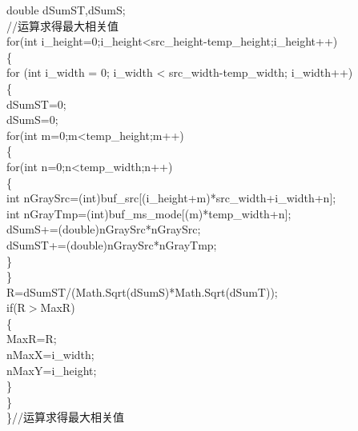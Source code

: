 ﻿\documentclass[12pt,a4paper,oneside]{book}
\begin{document}
\begin{enumerate}
\hspace*{4em}double dSumST,dSumS;\\
\hspace*{4em}//运算求得最大相关值\\
\hspace*{4em}for(int i\_height=0;i\_height<src\_height-temp\_height;i\_height++)\\
\hspace*{4em}\{\\
\hspace*{6em}for (int i\_width = 0; i\_width < src\_width-temp\_width; i\_width++)    \\
\hspace*{6em}\{\\
\hspace*{8em}dSumST=0;\\
\hspace*{8em}dSumS=0;\\
\hspace*{8em}for(int m=0;m<temp\_height;m++)\\
\hspace*{8em}\{\\
\hspace*{10em}for(int n=0;n<temp\_width;n++)\\
\hspace*{10em}\{\\
\hspace*{12em}int nGraySrc=(int)buf\_src[(i\_height+m)*src\_width+i\_width+n];\\
\hspace*{12em}int nGrayTmp=(int)buf\_ms\_mode[(m)*temp\_width+n];\\
\hspace*{12em}dSumS+=(double)nGraySrc*nGraySrc;\\
\hspace*{12em}dSumST+=(double)nGraySrc*nGrayTmp;\\
\hspace*{10em}\}\\
\hspace*{8em}\}\\
\hspace*{8em}R=dSumST/(Math.Sqrt(dSumS)*Math.Sqrt(dSumT));\\
\hspace*{8em}if(R$>$MaxR)\\
\hspace*{8em}\{\\
\hspace*{10em}MaxR=R;\\
\hspace*{10em}nMaxX=i\_width;\\
\hspace*{10em}nMaxY=i\_height;\\
\hspace*{8em}\}\\
\hspace*{6em}\}\\
\hspace*{4em}\}//运算求得最大相关值\\
\hspace*{4em}\\


\end{enumerate}
\end{document}
